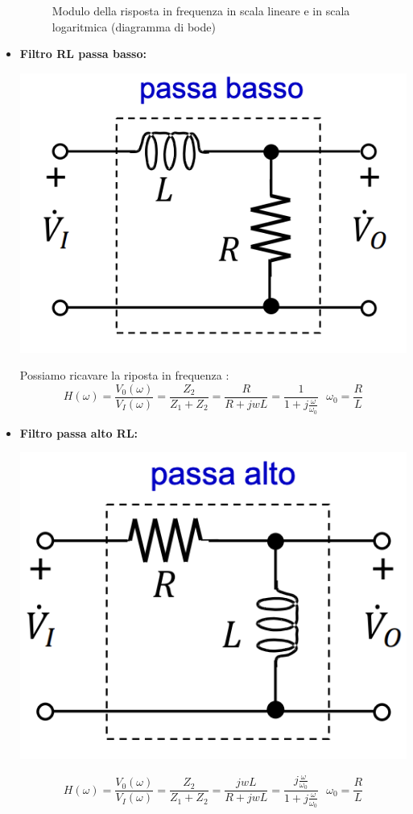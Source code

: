 \documentclass{article}
\theoremstyle{definition}
\begin{document}
\begin{itemize}
\begin{figure}[h]
	\caption{Modulo della risposta in frequenza in scala lineare e in scala logaritmica (diagramma di bode)}
\end{figure}
\item \textbf{Filtro RL passa basso: }
\begin{center}
\includegraphics[scale=0.50]{immagini/pbl}
\end{center}
Possiamo ricavare la riposta in frequenza :
$$H(\omega)=\frac{V_0(\omega)}{V_I(\omega)}=\frac{Z_2}{Z_1+Z_2}=\frac{R}{R+jwL}=\frac{1}{1+j\frac{\omega}{\omega_0}} \ \ \ \omega_0=\frac{R}{L}$$
\item \textbf{Filtro passa alto RL:}
\begin{center}
	\includegraphics[scale=0.50]{immagini/pal}
\end{center}
$$H(\omega)=\frac{V_0(\omega)}{V_I(\omega)}=\frac{Z_2}{Z_1+Z_2}=\frac{jwL}{R+jwL}=\frac{j\frac{\omega}{\omega_0}}{1+j\frac{\omega}{\omega_0}} \ \ \ \omega_0=\frac{R}{L}$$
\end{itemize}
\end{document}

